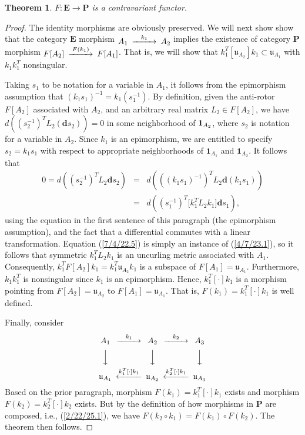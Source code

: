 \documentclass{amsart}
\numberwithin{equation}{section}
\newtheorem{theorem}{Theorem}
\theoremstyle{definition}
\numberwithin{theorem}{section}
\begin{document}
\begin{theorem}\label{6/13/22.1}  $F: \mathbf{E}\rightarrow \mathbf{P}$ is a contravariant functor. 
 \end{theorem}
 \begin{proof}  The identity morphisms are obviously preserved.
We will next show show that the category $\mathbf{E}$ morphism $ \begin{CD}  A_1 @>k_1>> A_2\end{CD}$ implies the existence of category {\bf P} morphism $ \begin{CD}  F[A_2] @>F(k_1)>> F[A_1]\end{CD}$.  That is, we will show that $k_1^T[\mathfrak{u}_{A_2}]k_1 \subset \mathfrak{u}_{A_1}$ with $k_1k_1^T$ nonsingular.

 Taking $s_1$ to be notation for a variable in $A_1$, it follows from the epimorphism assumption that $(k_1s_1)^{-1} = k_1(s_1^{-1})$.  By definition, given the anti-rotor $F[A_2]$ associated with $A_2$, and an arbitrary real matrix  $L_2 \in F[A_2]$, we have $d\left((s_2^{-1})^TL_2 (\mathbf{d}s_2)\right) = 0$ in some neighborhood of ${\bf 1}_{A_2}$, where $s_2$ is notation for a variable in $A_2$.  Since $k_1$ is an epimorphism, we are entitled to specify $s_2=k_1 s_1$ with respect to appropriate neighborhoods of $\mathbf{1}_{A_1}$ and $\mathbf{1}_{A_2}$.   It follows that \begin{eqnarray}\nonumber 0 = d\left((s_2^{-1})^TL_2 \mathbf{d}s_2\right) &=&  d\left(((k_1s_1)^{-1})^TL_2 \mathbf{d}(k_1s_1)\right) \\  &=& d\left((s_1^{-1})^T \big[k_1^T L_2k_1\big]\mathbf{d}s_1\right), \label{7/4/22.5}  \end{eqnarray}   using the equation in the first sentence of this paragraph (the epimorphism assumption), and the fact that a differential commutes with a linear transformation.  Equation (\ref{7/4/22.5}) is simply an instance of (\ref{4/7/23.1}), so it follows that symmetric $k_1^T L_2k_1$ is an uncurling metric associated with $A_1$.  
 Consequently, $k_1^TF[A_2]k_1 = k_1^T\mathfrak{u}_{A_2}k_1$ is a subspace of $F[A_1] = \mathfrak{u}_{A_1}$.  Furthermore, $k_1k_1^T$ is nonsingular since $k_1$ is an epimorphism.  Hence, $k_1^T[\cdot]k_1$ is a morphism pointing from $F[A_2]= \mathfrak{u}_{A_2}$ to $F[A_1]=\mathfrak{u}_{A_1}$.  That is, $F(k_1)=k_1^T[\cdot]k_1$ is well defined.

Finally, consider
      \[  \begin{CD}  
A_1 @>k_1>> A_2 @>k_2>> A_3\\
 @VVV   @VVV  @VVV\\
\mathfrak{u}_{A_1}   @<k_1^T[\cdot]k_1<<  \mathfrak{u}_{A_2}  @<k_2^T[\cdot]k_1<<  \mathfrak{u}_{A_3} \\ 
 \end{CD} \]
Based on the prior paragraph, morphism $F(k_1) = k_1^T[\cdot]k_1$ exists and morphism $F(k_2) = k_2^T[\cdot]k_2$ exists.  But by the definition of how morphisms in $\mathbf{P}$ are composed, i.e., (\ref{2/22/25.1}), we have $ F(k_2\circ k_1) = F(k_1)\circ F(k_2)$.   The theorem then follows.
\end{proof}
\end{document}

